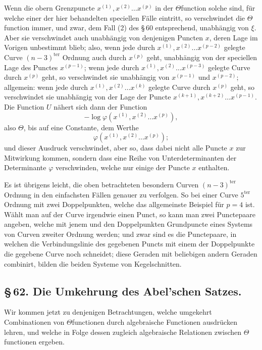 \documentclass[10pt]{article}
\begin{document}
Wenn die obern Grenzpuncte \(x^{(1)},x^{(2)}\ldots x^{(p)}\) in der \(\Theta\)function solche sind, für welche einer der hier behandelten speciellen Fälle eintritt, so verschwindet die \(\Theta\)function immer, und zwar, dem Fall (2) des \S\,60 entsprechend, unabhängig von \(\xi\). Aber sie verschwindet auch unabhängig von denjenigen Puncten \(x\), deren Lage im Vorigen unbestimmt blieb; also, wenn jede durch \(x^{(1)},x^{(2)}\ldots x^{(p-2)}\) gelegte Curve \((n-3)^{\mathrm{ter}}\) Ordnung auch durch \(x^{(p)}\) geht, unabhängig von der speciellen Lage des Punctes \(x^{(p-1)}\); wenn jede durch \(x^{(1)},x^{(2)}\ldots x^{(p-3)}\) gelegte Curve durch \(x^{(p)}\) geht, so verschwindet sie unabhängig von \(x^{(p-1)}\) und \(x^{(p-2)}\); allgemein: wenn jede durch \(x^{(1)},x^{(2)}\ldots x^{(k)}\) gelegte Curve durch \(x^{(p)}\) geht, so verschwindet sie unabhängig von der Lage der Puncte \(x^{(k+1)},x^{(k+2)}\ldots x^{(p-1)}\). Die Function \(U\) nähert sich dann der Function
\[
-\log\varphi(x^{(1)},x^{(2)}\ldots x^{(p)}),
\]
also \(\Theta\), bis auf eine Constante, dem Werthe
\[
\varphi(x^{(1)},x^{(2)}\ldots x^{(p)});
\]
und dieser Ausdruck verschwindet, aber so, dass dabei nicht alle Puncte \(x\) zur Mitwirkung kommen, sondern dass eine Reihe von Unterdeterminanten der Determinante \(\varphi\) verschwinden, welche nur einige der Puncte \(x\) enthalten.

Es ist übrigens leicht, die oben betrachteten besondern Curven \((n-3)^{\mathrm{ter}}\) Ordnung in den einfachsten Fällen genauer zu verfolgen. So bei einer Curve \(5^{\mathrm{ter}}\) Ordnung mit zwei Doppelpunkten, welche das allgemeinste Beispiel für \(p=4\) ist. Wählt man auf der Curve irgendwie einen Punct, so kann man zwei Punctepaare angeben, welche mit jenem und den Doppelpunkten Grundpuncte eines Systems von Curven zweiter Ordnung werden; und zwar sind es die Punctepaare, in welchen die Verbindungslinie des gegebenen Puncts mit einem der Doppelpunkte die gegebene Curve noch schneidet; diese Geraden mit beliebigen andern Geraden combinirt, bilden die beiden Systeme von Kegelschnitten.

\subsection*{\S\,62. Die Umkehrung des Abel'schen Satzes.}

Wir kommen jetzt zu denjenigen Betrachtungen, welche umgekehrt Combinationen von \(\Theta\)functionen durch algebraische Functionen ausdrücken lehren, und welche in Folge dessen zugleich algebraische Relationen zwischen \(\Theta\)functionen ergeben.
\end{document}
